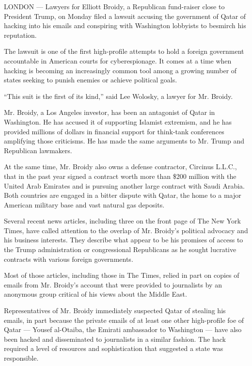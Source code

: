 LONDON --- Lawyers for Elliott Broidy, a Republican fund-raiser close to
President Trump, on Monday filed a lawsuit accusing the government of
Qatar of hacking into his emails and conspiring with Washington
lobbyists to besmirch his reputation.

The lawsuit is one of the first high-profile attempts to hold a foreign
government accountable in American courts for cyberespionage. It comes
at a time when hacking is becoming an increasingly common tool among a
growing number of states seeking to punish enemies or achieve political
goals.

``This suit is the first of its kind,'' said Lee Wolosky, a lawyer for
Mr. Broidy.

Mr. Broidy, a Los Angeles investor, has been an antagonist of Qatar in
Washington. He has accused it of supporting Islamist extremism, and he
has provided millions of dollars in financial support for think-tank
conferences amplifying those criticisms. He has made the same arguments
to Mr. Trump and Republican lawmakers.

At the same time, Mr. Broidy also owns a defense contractor, Circinus
L.L.C., that in the past year signed a contract worth more than \$200
million with the United Arab Emirates and is pursuing another large
contract with Saudi Arabia. Both countries are engaged in a bitter
dispute with Qatar, the home to a major American military base and vast
natural gas deposits.

Several recent news articles, including three on the front page of The
New York Times, have called attention to the overlap of Mr. Broidy's
political advocacy and his business interests. They describe what appear
to be his promises of access to the Trump administration or
congressional Republicans as he sought lucrative contracts with various
foreign governments.

Most of those articles, including those in The Times, relied in part on
copies of emails from Mr. Broidy's account that were provided to
journalists by an anonymous group critical of his views about the Middle
East.

Representatives of Mr. Broidy immediately suspected Qatar of stealing
his emails, in part because the private emails of at least one other
high-profile foe of Qatar --- Yousef al-Otaiba, the Emirati ambassador
to Washington --- have also been hacked and disseminated to journalists
in a similar fashion. The hack required a level of resources and
sophistication that suggested a state was responsible.

